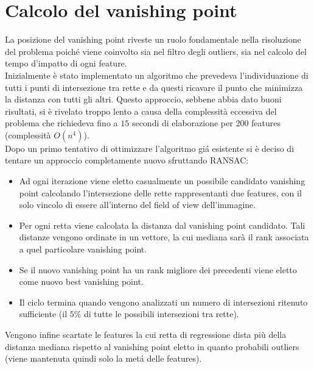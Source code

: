 \documentclass[12pt]{report}
\begin{document}
\section{Calcolo del vanishing point}
La posizione del vanishing point riveste un ruolo fondamentale nella risoluzione del problema poich\'e viene coinvolto sia nel filtro degli outliers, sia nel calcolo del tempo d'impatto di ogni feature.\\

\noindent Inizialmente \`e stato implementato un algoritmo che prevedeva l'individuazione di tutti i punti di intersezione tra rette e da questi ricavare il punto che minimizza la distanza con tutti gli altri. Questo approccio, sebbene abbia dato buoni risultati, si \`e rivelato troppo lento a causa della complessit\`a eccessiva del problema che richiedeva fino a $15$ secondi di elaborazione per $200$ features (complessit\`a $O\left(n^4\right)$).\\

\noindent Dopo un primo tentativo di ottimizzare l'algoritmo gi\'a esistente si \`e deciso di tentare un approccio completamente nuovo sfruttando RANSAC:

\begin{itemize}
\item	Ad ogni iterazione viene eletto casualmente un possibile candidato vanishing point calcolando l'intersezione delle rette rappresentanti due features, con il solo vincolo di essere all'interno del field of view dell'immagine.
\item	Per ogni retta viene calcolata la distanza dal vanishing point candidato. Tali distanze vengono ordinate in un vettore, la cui mediana sar\`a il rank associata a quel particolare vanishing point.
\item	Se il nuovo vanishing point ha un rank migliore dei precedenti viene eletto come nuovo best vanishing point.
\item	Il ciclo termina quando vengono analizzati un numero di intersezioni ritenuto sufficiente (il $5\%$ di tutte le possibili intersezioni tra rette).
\end{itemize}

\noindent Vengono infine scartate le features la cui retta di regressione dista pi\`u della distanza mediana rispetto al vanishing point eletto in quanto probabili outliers (viene mantenuta quindi solo la met\'a delle features).
\end{document}
